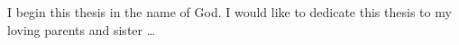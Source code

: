 
\begin{dedication} 

I begin this thesis in the name of God. I would like to dedicate this thesis to my loving parents and sister \dots

\end{dedication}

